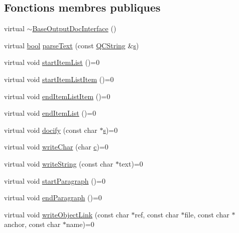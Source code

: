 \subsection*{Fonctions membres publiques}
\begin{DoxyCompactItemize}
\item 
virtual \hyperlink{class_base_output_doc_interface_ac23dcf3208e5199e2b562c2643536beb}{$\sim$\+Base\+Output\+Doc\+Interface} ()
\item 
virtual \hyperlink{qglobal_8h_a1062901a7428fdd9c7f180f5e01ea056}{bool} \hyperlink{class_base_output_doc_interface_a26c20546f1084cdaea8c6fe1ec8de76a}{parse\+Text} (const \hyperlink{class_q_c_string}{Q\+C\+String} \&\hyperlink{060__command__switch_8tcl_a011c73f2dbb87635a3b4206c72355f6e}{s})
\item 
virtual void \hyperlink{class_base_output_doc_interface_a54b169393594b6cf113977ccccaeb9ee}{start\+Item\+List} ()=0
\item 
virtual void \hyperlink{class_base_output_doc_interface_aa1cbcadfedf8e6d52029d17526b5fa3f}{start\+Item\+List\+Item} ()=0
\item 
virtual void \hyperlink{class_base_output_doc_interface_a90d290d7a06a9e7ecd968c8da90ed665}{end\+Item\+List\+Item} ()=0
\item 
virtual void \hyperlink{class_base_output_doc_interface_a3493b65672bf134033bd3bb296acdff4}{end\+Item\+List} ()=0
\item 
virtual void \hyperlink{class_base_output_doc_interface_ad7d3f6631bd157739170690e669b3e75}{docify} (const char $\ast$\hyperlink{060__command__switch_8tcl_a011c73f2dbb87635a3b4206c72355f6e}{s})=0
\item 
virtual void \hyperlink{class_base_output_doc_interface_a1577324720c1c71142dff84ae80b058d}{write\+Char} (char \hyperlink{060__command__switch_8tcl_ab14f56bc3bd7680490ece4ad7815465f}{c})=0
\item 
virtual void \hyperlink{class_base_output_doc_interface_a5737513ddf260787b5b79c84ae1059af}{write\+String} (const char $\ast$text)=0
\item 
virtual void \hyperlink{class_base_output_doc_interface_a731e8b90a344b185fff49d13858efbb3}{start\+Paragraph} ()=0
\item 
virtual void \hyperlink{class_base_output_doc_interface_ab76280c2eb451ad160991707206b6c95}{end\+Paragraph} ()=0
\item 
virtual void \hyperlink{class_base_output_doc_interface_a3537423635807fe140ec5be1a2198060}{write\+Object\+Link} (const char $\ast$ref, const char $\ast$file, const char $\ast$anchor, const char $\ast$name)=0

\end{DoxyCompactItemize}
